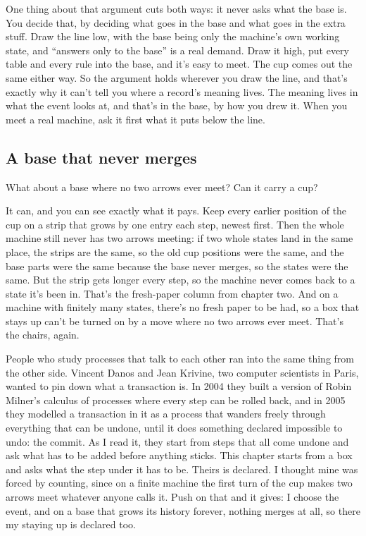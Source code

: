 \documentclass[11pt,twoside]{article}
\theoremstyle{thielethm}
\theoremstyle{thieledef}
\theoremstyle{thieledef}
\theoremstyle{thieledef}
\theoremstyle{thielethm}
\theoremstyle{thieleobs}
\theoremstyle{thielethm}
\begin{document}
One thing about that argument cuts both ways: it never asks what the base is. You decide that, by deciding what goes in the base and what goes in the extra stuff. Draw the line low, with the base being only the machine's own working state, and ``answers only to the base'' is a real demand. Draw it high, put every table and every rule into the base, and it's easy to meet. The cup comes out the same either way. So the argument holds wherever you draw the line, and that's exactly why it can't tell you where a record's meaning lives. The meaning lives in what the event looks at, and that's in the base, by how you drew it. When you meet a real machine, ask it first what it puts below the line.

\subsection{A base that never merges}

What about a base where no two arrows ever meet? Can it carry a cup?

It can, and you can see exactly what it pays. Keep every earlier position of the cup on a strip that grows by one entry each step, newest first. Then the whole machine still never has two arrows meeting: if two whole states land in the same place, the strips are the same, so the old cup positions were the same, and the base parts were the same because the base never merges, so the states were the same. But the strip gets longer every step, so the machine never comes back to a state it's been in. That's the fresh-paper column from chapter two. And on a machine with finitely many states, there's no fresh paper to be had, so a box that stays up can't be turned on by a move where no two arrows ever meet. That's the chairs, again.

People who study processes that talk to each other ran into the same thing from the other side. Vincent Danos and Jean Krivine, two computer scientists in Paris, wanted to pin down what a transaction is. In 2004 they built a version of Robin Milner's calculus of processes where every step can be rolled back, and in 2005 they modelled a transaction in it as a process that wanders freely through everything that can be undone, until it does something declared impossible to undo: the commit. As I read it, they start from steps that all come undone and ask what has to be added before anything sticks. This chapter starts from a box and asks what the step under it has to be. Theirs is declared. I thought mine was forced by counting, since on a finite machine the first turn of the cup makes two arrows meet whatever anyone calls it. Push on that and it gives: I choose the event, and on a base that grows its history forever, nothing merges at all, so there my staying up is declared too.
\end{document}
